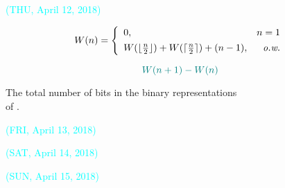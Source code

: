 \begin{frame}{}
  {\vspace{-0.50cm} \centerline{\textcolor{cyan}{\small (THU, April 12, 2018)}}}

  \vspace{0.30cm}
  \[
    W(n) = \left\{\begin{array}{lr}
      0,	& n = 1 \\[4pt]
      W(\lfloor \frac{n}{2} \rfloor) + W(\lceil \frac{n}{2} \rceil) + (n - 1), & \text{\it o.w.}
    \end{array}\right.
  \]

  \vspace{0.30cm}
  \[
    \textcolor{teal}{W(n+1) - W(n)}
  \]

  \vspace{0.10cm}
  \begin{center}
    {\large {The total number of bits in the binary representations \\ of .}}
  \end{center}
\end{frame}

\begin{frame}{}
  {\vspace{-0.50cm} \centerline{\textcolor{cyan}{\small (FRI, April 13, 2018)}}}

\end{frame}

\begin{frame}{}
  {\vspace{-0.50cm} \centerline{\textcolor{cyan}{\small (SAT, April 14, 2018)}}}

\end{frame}

\begin{frame}{}
  {\vspace{-0.50cm} \centerline{\textcolor{cyan}{\small (SUN, April 15, 2018)}}}

\end{frame}
